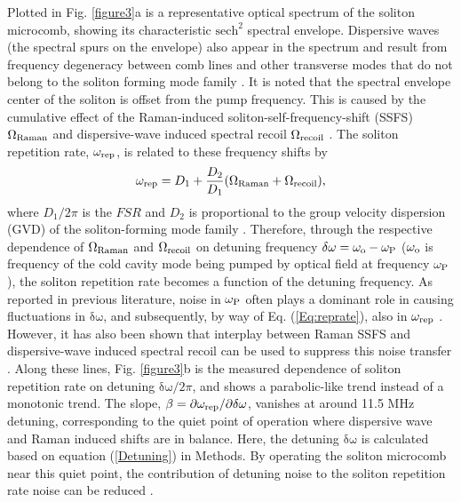 \documentclass[noshowpacs,amsmath,
twocolumn,
superscriptaddress,
8pt,
aps,prb]{revtex4-2}
\begin{document}
\noindent Plotted in Fig. \ref{figure3}a is a representative optical spectrum of the soliton microcomb, showing its characteristic $\mathrm{sech}^2$ spectral envelope. Dispersive waves (the spectral spurs on the envelope) also appear in the spectrum and result from frequency degeneracy between comb lines and other transverse modes that do not belong to the soliton forming mode family \cite{herr2014mode,yang2016spatial,yi2017single,guo2017intermode}. It is noted that the spectral envelope center of the soliton is offset from the pump frequency. This is caused by the cumulative effect of the Raman-induced soliton-self-frequency-shift (SSFS) $\Omega_{\rm Raman}$ \cite{karpov2016raman,yi2016theory,yang2016spatial} and dispersive-wave induced spectral recoil $\Omega_{\rm recoil}$ \cite{lucas2017detuning,yi2017single,guo2017intermode}. The soliton repetition rate, $\omega_{\rm rep}$, is related to these frequency shifts by \cite{yang2016spatial,yi2017single}
\begin{equation} 
    \omega_{\rm rep}
    =D_{1}+\frac{D_{2}}{D_{1}}(\Omega_{\rm Raman}+\Omega_{\rm recoil}),
    \label{Eq:reprate}
\end{equation}
where $D_1/2\pi$ is the $FSR$ and $D_{2}$ is proportional to the group velocity dispersion (GVD) of the soliton-forming mode family \cite{herr2014temporal,yi2015soliton}. Therefore, through the respective dependence of $\Omega_{\rm Raman}$ and $\Omega_{\rm recoil}$ on detuning frequency $\mathrm{\delta\omega} = \omega_{\rm o} - \omega_{\rm P}$ ($\omega_{\rm o}$ is frequency of the cold cavity mode being pumped by optical field at frequency $\omega_{\rm P}$), the soliton repetition rate becomes a function of the detuning frequency. As reported in previous literature, noise in $\omega_{\rm P}$ often plays a dominant role in causing fluctuations in $\mathrm{\delta\omega}$, and subsequently, by way of Eq. (\ref{Eq:reprate}), also in $\omega_{\rm rep}$   \cite{yi2017single,stone2018thermal,lucas2020ultralow}. However, it has also been shown that interplay between Raman SSFS and dispersive-wave induced spectral recoil can be used to suppress this noise transfer \cite{yi2017single,lucas2020ultralow}. Along these lines, Fig. \ref{figure3}b is the measured dependence of soliton repetition rate on detuning $\mathrm{\delta \omega} / 2 \pi$, and shows a parabolic-like trend instead of a monotonic trend. The slope, $\beta=\partial\omega_{\rm rep}/\partial\mathrm{\delta\omega}$, vanishes at around 11.5 MHz detuning, corresponding to the quiet point of operation where dispersive wave and Raman induced shifts are in balance. Here, the detuning $\mathrm{\delta \omega}$ is calculated based on equation (\ref{Detuning}) in Methods. By operating the soliton microcomb near this quiet point, the contribution of detuning noise to the soliton repetition rate noise can be reduced \cite{yi2017single,lucas2020ultralow}.
\end{document}
